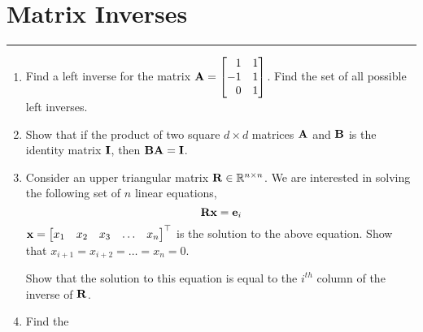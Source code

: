\documentclass[
11pt, %
a4paper, %
oneside, %
headinclude,footinclude, %
BCOR5mm, %
]{scrartcl}
\def\mf{\ensuremath\mathbf}
\def\mb{\ensuremath\mathbb}
\def\bmx{\ensuremath\begin{bmatrix*}[r]}
\def\emx{\ensuremath\end{bmatrix*}}
\def\bmxc{\ensuremath\begin{bmatrix*}[c]}
\begin{document}
\newpage
\section{Matrix Inverses}
\hrule
\vspace{0.5cm}

\begin{enumerate}
	\item Find a left inverse for the matrix $\mf{A} = \bmx 1 & 1 \\ -1 & 1 \\ 0 & 1\emx$. Find the set of all possible left inverses. 
	
	\item Show that if the product of two square $d \times d$ matrices $\mf{A}$ and $\mf{B}$ is the identity matrix $\mf{I}$, then $\mf{B}\mf{A} = \mf{I}$.
	
	\item Consider an upper triangular matrix $\mf{R} \in \mb{R}^{n \times n}$. We are interested in solving the following set of $n$ linear equations,
	\[ \mf{R} \mf{x} = \mf{e}_i \]
	$\mf{x} = \bmxc x_1 & x_2 & x_3 & \ldots & x_n \emx^\top$ is the solution to the above equation. Show that $x_{i+1} = x_{i+2} = \ldots = x_n = 0$.

	Show that the solution to this equation is equal to the $i^{th}$ column of the inverse of $\mf{R}$.

	\item Find the 
\end{enumerate}
\end{document}
